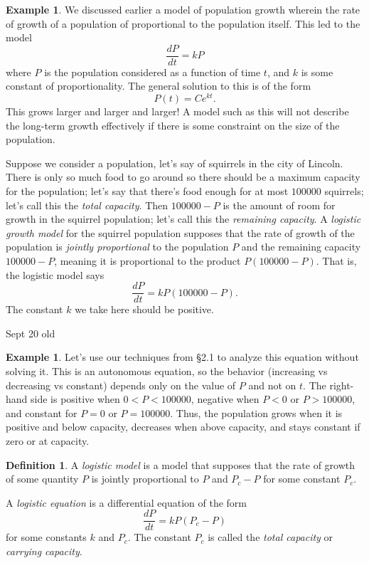 \documentclass[12pt]{amsart}
\numberwithin{equation}{section}
\theoremstyle{plain} %
\newcommand{\Sept}[1]{Sept #1 old}
\theoremstyle{definition}
\newtheorem{defn}[equation]{Definition}
\newtheorem{ex}[equation]{Example}
\theoremstyle{remark}
\begin{document}
\begin{ex} We discussed earlier a model of population growth wherein the rate of growth of a population of proportional to the population itself. This led to the model
\[ \frac{dP}{dt} = k P\]
where $P$ is the population considered as a function of time $t$, and $k$ is some constant of proportionality. The general solution to this is of the form
\[ P(t) = C e^{kt}.\]
This grows larger and larger and larger! A model such as this will not describe the long-term growth effectively if there is some constraint on the size of the population.

Suppose we consider a population, let's say of squirrels in the city of Lincoln. There is only so much food to go around so there should be a maximum capacity for the population; let's say that there's food enough for at most $100000$ squirrels; let's call this the \emph{total capacity}. Then $100000-P$ is the amount of room for growth in the squirrel population; let's call this the \emph{remaining capacity}. A \emph{logistic growth model} for the squirrel population supposes that the rate of growth of the population is \emph{jointly proportional} to the population $P$ and the remaining capacity $100000-P$, meaning it is proportional to the product $P (100000-P)$. That is, the logistic model says
\[ \frac{dP}{dt} = k  P (100000-P).\]
The constant $k$ we take here should be positive.
\end{ex}

\Sept{20}

 \begin{ex}
Let's use our techniques from \S2.1 to analyze this equation without solving it. This is an autonomous equation, so the behavior (increasing vs decreasing vs constant) depends only on the value of $P$ and not on $t$. The right-hand side is positive when $0<P<100000$, negative when $P<0$ or $P>100000$, and constant for $P=0$ or $P=100000$. Thus, the population grows when it is positive and below capacity, decreases when above capacity, and stays constant if zero or at capacity.
\end{ex}

\begin{defn}
A \emph{logistic model} is a model that supposes that the rate of growth of some quantity $P$ is jointly proportional to $P$ and $P_c - P$ for some constant $P_c$.

A \emph{logistic equation} is a differential equation of the form
\[ \frac{dP}{dt} = k P (P_{c} - P)\]
for some constants $k$ and $P_c$. The constant $P_c$ is called the \emph{total capacity} or \emph{carrying capacity}.
\end{defn}
\end{document}
